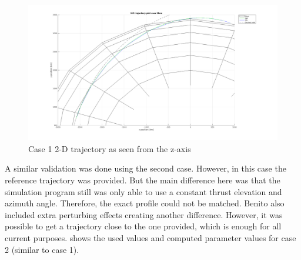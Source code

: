 \begin{figure}[!ht]
\centering
\includegraphics[width=0.8 \textwidth]{figures/verification/case1/PlotFigure1SeenFromZoomZaxis.png}
\caption{Case 1 2-D trajectory as seen from the z-axis}
\label{fig:PlotFigure1SeenFromZoomZaxis}
\end{figure}

A similar validation was done using the second case. However, in this case the reference trajectory was provided. But the main difference here was that the simulation program still was only able to use a constant thrust elevation and azimuth angle. Therefore, the exact profile could not be matched. Benito also included extra perturbing effects creating another difference. However, it was possible to get a trajectory close to the one provided, which is enough for all current purposes.  shows the used values and computed parameter values for case 2 (similar to case 1).  




